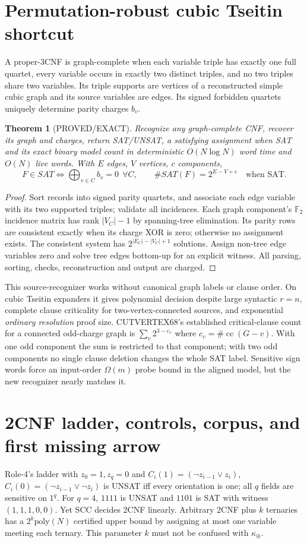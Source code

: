 \documentclass[11pt]{article}
\newtheorem{theorem}{Theorem}
\begin{document}
\section{Permutation-robust cubic Tseitin shortcut}
A proper-3CNF is graph-complete when each variable triple has exactly one full quartet, every variable occurs in exactly two distinct triples, and no two triples share two variables. Its triple supports are vertices of a reconstructed simple cubic graph and its source variables are edges. Its signed forbidden quartets uniquely determine parity charges $b_v$.
\begin{theorem}[PROVED/EXACT]
Recognize any graph-complete CNF, recover its graph and charges, return SAT/UNSAT, a satisfying assignment when SAT and its exact binary model count in deterministic $O(N\log N)$ word time and $O(N)$ live words. With $E$ edges, $V$ vertices, $c$ components,
\[
F\in SAT\iff \bigoplus_{v\in C}b_v=0\ \ \forall C,\qquad
\#SAT(F)=2^{E-V+c}\quad\text{when SAT}.
\]
\end{theorem}
\begin{proof}
Sort records into signed parity quartets, and associate each edge variable with its two supported triples; validate all incidences. Each graph component's $\mathbb F_2$ incidence matrix has rank $|V_C|-1$ by spanning-tree elimination. Its parity rows are consistent exactly when its charge XOR is zero; otherwise no assignment exists. The consistent system has $2^{|E_C|-|V_C|+1}$ solutions. Assign non-tree edge variables zero and solve tree edges bottom-up for an explicit witness. All parsing, sorting, checks, reconstruction and output are charged.
\end{proof}
This source-recognizer works without canonical graph labels or clause order. On cubic Tseitin expanders it gives polynomial decision despite large syntactic $r=n$, complete clause criticality for two-vertex-connected sources, and exponential \emph{ordinary resolution} proof size. CUTVERTEX68's established critical-clause count for a connected odd-charge graph is $\sum_v2^{3-c_v}$ where $c_v=\#\operatorname{cc}(G-v)$. With one odd component the sum is restricted to that component; with two odd components no single clause deletion changes the whole SAT label. Sensitive sign words force an input-order $\Omega(m)$ probe bound in the aligned model, but the new recognizer nearly matches it.

\section{2CNF ladder, controls, corpus, and first missing arrow}
Role-4's ladder with $z_0=1,z_q=0$ and $C_i(1)=(\neg z_{i-1}\vee z_i)$, $C_i(0)=(\neg z_{i-1}\vee\neg z_i)$ is UNSAT iff every orientation is one; all $q$ fields are sensitive on $1^q$. For $q=4$, $1111$ is UNSAT and $1101$ is SAT with witness $(1,1,1,0,0)$. Yet SCC decides 2CNF linearly. Arbitrary 2CNF plus $k$ ternaries has a $2^k\mathrm{poly}(N)$ certified upper bound by assigning at most one variable meeting each ternary. This parameter $k$ must not be confused with $\kappa_\oplus$.
\end{document}
